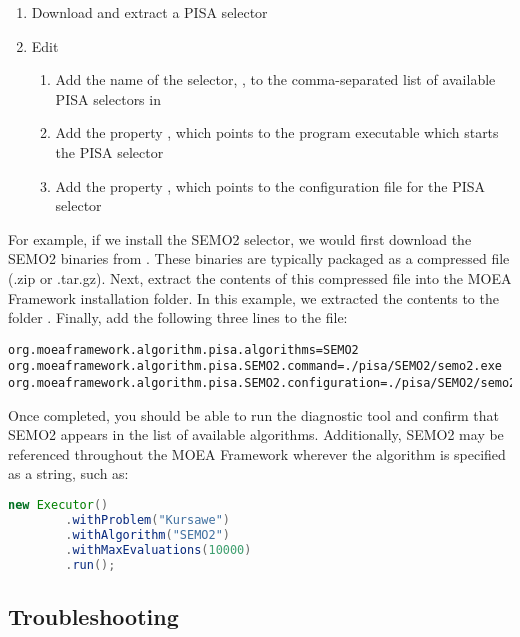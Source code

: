 \begin{enumerate}
  \item Download and extract a PISA selector
  \item Edit 
    \begin{enumerate}
      \item Add the name of the selector, , to the comma-separated list of available PISA selectors in 
      \item Add the property , which points to the program executable which starts the PISA selector
      \item Add the property ,  which points to the configuration file for the PISA selector
    \end{enumerate}
\end{enumerate}

For example, if we install the SEMO2 selector, we would first download the SEMO2 binaries from .  These binaries are typically packaged as a compressed file (.zip or .tar.gz).  Next, extract the contents of this compressed file into the MOEA Framework installation folder.  In this example, we extracted the contents to the folder .  Finally, add the following three lines to the  file:

\begin{lstlisting}[language=Plaintext]
org.moeaframework.algorithm.pisa.algorithms=SEMO2
org.moeaframework.algorithm.pisa.SEMO2.command=./pisa/SEMO2/semo2.exe
org.moeaframework.algorithm.pisa.SEMO2.configuration=./pisa/SEMO2/semo2_params.txt
\end{lstlisting}

Once completed, you should be able to run the diagnostic tool and confirm that SEMO2 appears in the list of available algorithms.  Additionally, SEMO2 may be referenced throughout the MOEA Framework wherever the algorithm is specified as a string, such as:

\begin{lstlisting}[language=Java]
new Executor()
		.withProblem("Kursawe")
		.withAlgorithm("SEMO2")
		.withMaxEvaluations(10000)
		.run();
\end{lstlisting}

\subsection{Troubleshooting}

